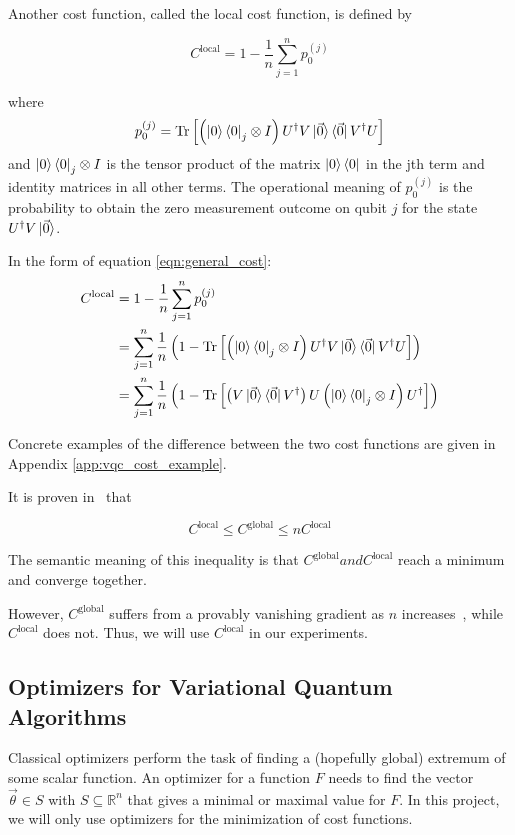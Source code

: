 \documentclass[a4paper,12pt]{article}
\newcommand{\thetas}{\vec{\theta}}
\DeclareMathOperator{\tr}{Tr}
\begin{document}
Another cost function, called the local cost function, is defined by 

\begin{equation}
    C^{\textrm{local}} = 1 - \frac{1}{n} \sum_{j=1}^{n} p_0^{(j)}
\end{equation}

where
\begin{equation} \label{eqn:local_vqc_cost}
    p_0^{(j)} = \tr \left[\left({\ket{0}\bra{0}}_j \otimes I\right) U^\dagger V \ket{\vec{0}}\bra{\vec{0}} V^\dagger U \right]
\end{equation}
and ${\ket{0}\bra{0}}_j \otimes I$ is the tensor product of the matrix $\ket{0}\bra{0}$ in the jth term and identity matrices in all other terms.
The operational meaning of $p_0^{(j)}$ is the probability to obtain the zero measurement outcome on qubit $j$ for the state $U^\dagger V\ket{\vec{0}}$.




In the form of equation \ref{eqn:general_cost}:
\begin{align*}
    C^{\textrm{local}} &= 1 - \frac{1}{n} \sum_{j=1}^{n} p_0^{(j)} \\
    &= \sum_{j=1}^n \frac{1}{n} \left(1 - \tr\left[\left({\ket{0}\bra{0}}_j \otimes I\right) U^\dagger V \ket{\vec{0}}\bra{\vec{0}} V^\dagger U\right] \right) \\
    &= \sum_{j=1}^n \frac{1}{n} \left(1 - \tr\left[ \left(V \ket{\vec{0}}\bra{\vec{0}} V^\dagger\right) U \left({\ket{0}\bra{0}}_j \otimes I\right) U^\dagger\right] \right)
\end{align*}

Concrete examples of the difference between the two cost functions are given in Appendix \ref{app:vqc_cost_example}.

It is proven in~\cite{sharma_noise_2020} that

\begin{equation}
    C^{\textrm{local}} \leq C^{\textrm{global}} \leq nC^{\textrm{local}}
\end{equation} 

The semantic meaning of this inequality is that $C^\textrm{global} and C^\textrm{local}$ reach a minimum and converge together.

However, $C^\textrm{global}$ suffers from a provably vanishing gradient as $n$ increases~\cite{cerezo_cost_2021}, while $C^\textrm{local}$ does not. Thus, we will use $C^\textrm{local}$ in our experiments.

\subsection{Optimizers for Variational Quantum Algorithms} \label{subsec:optimizers}
Classical optimizers perform the task of finding a (hopefully global) extremum of some scalar function.
An optimizer for a function $F$ needs to find the vector $\thetas \in S$ with $S \subseteq \mathbb{R}^n$ that gives a minimal or maximal value for $F$. In this project, we will only use optimizers for the minimization of cost functions.
\end{document}
